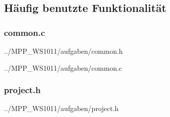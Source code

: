 \subsection*{Häufig benutzte Funktionalität}

\subsubsection*{common.c}

{../MPP_WS1011/aufgaben/common.h}

{../MPP_WS1011/aufgaben/common.c}

\subsubsection*{project.h}

{../MPP_WS1011/aufgaben/project.h}
